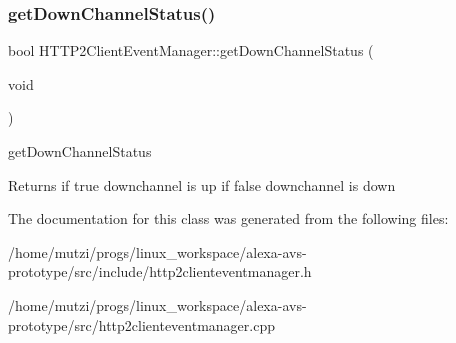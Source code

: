 \subsubsection{\texorpdfstring{get\+Down\+Channel\+Status()}{getDownChannelStatus()}}
{\footnotesize\ttfamily bool H\+T\+T\+P2\+Client\+Event\+Manager\+::get\+Down\+Channel\+Status (\begin{DoxyParamCaption}\item[{void}]{ }\end{DoxyParamCaption})}



get\+Down\+Channel\+Status 

\begin{DoxyReturn}{Returns}
if true downchannel is up if false downchannel is down 
\end{DoxyReturn}


The documentation for this class was generated from the following files\+:\begin{DoxyCompactItemize}
\item 
/home/mutzi/progs/linux\+\_\+workspace/alexa-\/avs-\/prototype/src/include/http2clienteventmanager.\+h\item 
/home/mutzi/progs/linux\+\_\+workspace/alexa-\/avs-\/prototype/src/http2clienteventmanager.\+cpp\end{DoxyCompactItemize}
